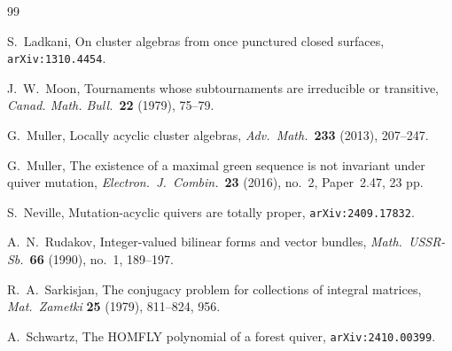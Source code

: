 \documentclass[11pt, letterpaper]{amsart}
\theoremstyle{definition}
\numberwithin{equation}{section}
\begin{document}
\begin{thebibliography}{99}

S.~Ladkani,
On cluster algebras from once punctured closed surfaces,
\texttt{arXiv:1310.4454}. 




J.~W.~Moon, 
Tournaments whose subtournaments are irreducible or transitive, 
\textsl{Canad. Math. Bull.}\ \textbf{22} (1979), 75--79. 

G.~Muller, 
Locally acyclic cluster algebras, 
\textsl{Adv.\ Math.}\ \textbf{233} (2013), 207--247.

G.~Muller, 
The existence of a maximal green sequence is not invariant under quiver mutation, 
\textsl{Electron.\ J.\ Combin.}\ \textbf{23} (2016), no.~2, Paper~2.47, 23 pp.

S.~Neville,
Mutation-acyclic quivers are totally proper, %
\texttt{arXiv:2409.17832}.




A.~N.~Rudakov, 
Integer-valued bilinear forms and vector bundles, 
\textsl{Math.\ USSR-Sb.}\ \textbf{66} (1990), no.~1, 189--197.

R.~A.~Sarkisjan, 
The conjugacy problem for collections of integral matrices, 
\textsl{Mat.\ Zametki} \textbf{25} (1979), 811--824, 956.


A.~Schwartz,
The HOMFLY polynomial of a forest quiver,
\texttt{arXiv:2410.00399}.


\end{thebibliography}
\end{document}
